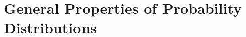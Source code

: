 \documentclass[../main.tex]{subfiles}
\begin{document}
\chapter{General Properties of Probability Distributions}
\end{document}
